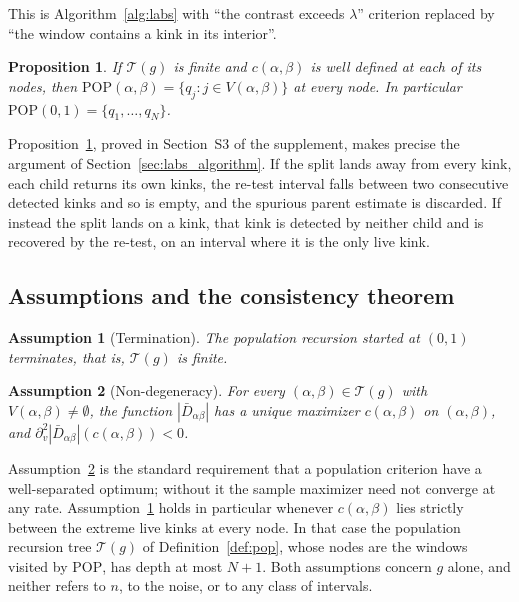 \documentclass[12pt, a4paper]{article}
\newtheorem{prop}{Proposition}[section]
\newtheorem{assumption}{Assumption}[section]
\begin{document}
This is Algorithm~\ref{alg:labs} with ``the contrast exceeds $\lambda$'' criterion replaced by ``the window contains a kink in its interior''.

\begin{prop}
\label{prop:popexact}
If $\mathcal{T}(g)$ is finite and $c(\alpha,\beta)$ is well defined at each of its nodes, then $\mathrm{POP}(\alpha,\beta) = \{ q_j : j \in V(\alpha,\beta) \}$ at every node. In particular $\mathrm{POP}(0,1) = \{q_1, \ldots, q_N\}$.
\end{prop}

Proposition~\ref{prop:popexact}, proved in Section~S3 of the supplement, makes precise the argument of Section~\ref{sec:labs_algorithm}. If the split lands away from every kink, each child returns its own kinks, the re-test interval falls between two consecutive detected kinks and so is empty, and the spurious parent estimate is discarded. If instead the split lands on a kink, that kink is detected by neither child and is recovered by the re-test, on an interval where it is the only live kink.

\subsection{Assumptions and the consistency theorem}

\begin{assumption}[Termination]
\label{ass:term}
The population recursion started at $(0,1)$ terminates, that is, $\mathcal{T}(g)$ is finite.
\end{assumption}

\begin{assumption}[Non-degeneracy]
\label{ass:nondeg}
For every $(\alpha,\beta) \in \mathcal{T}(g)$ with $V(\alpha,\beta) \neq \emptyset$, the function $|\bar D_{\alpha\beta}|$ has a unique maximizer $c(\alpha,\beta)$ on $(\alpha,\beta)$, and $\partial_v^2 |\bar D_{\alpha\beta}| (c(\alpha,\beta)) < 0$.
\end{assumption}

Assumption~\ref{ass:nondeg} is the standard requirement that a population criterion have a well-separated optimum; without it the sample maximizer need not converge at any rate.
Assumption~\ref{ass:term} holds in particular whenever $c(\alpha,\beta)$ lies strictly between the extreme live kinks at every node. In that case the population recursion tree $\mathcal{T}(g)$ of Definition~\ref{def:pop}, whose nodes are the windows visited by $\mathrm{POP}$, has depth at most $N+1$.
Both assumptions concern $g$ alone, and neither refers to $n$, to the noise, or to any class of intervals. 
\end{document}
